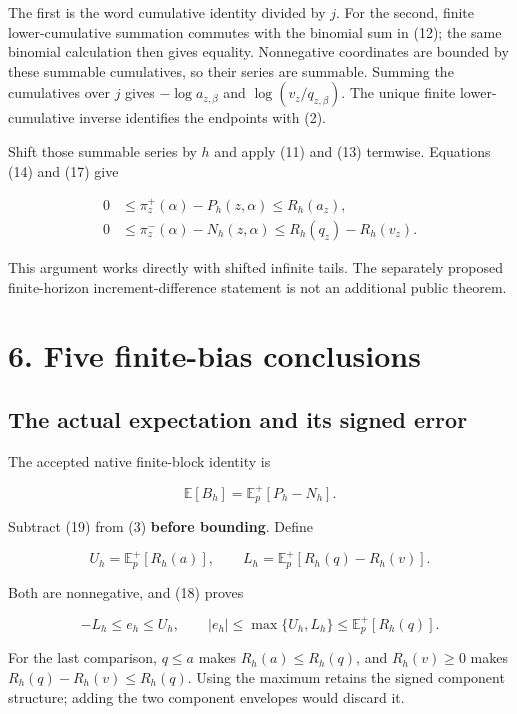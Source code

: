 \documentclass[11pt,a4paper]{article}
\begin{document}
The first is the word cumulative identity divided by \(j\). For the second, finite lower-cumulative summation commutes with the binomial sum in (12); the same binomial calculation then gives equality. Nonnegative coordinates are bounded by these summable cumulatives, so their series are summable. Summing the cumulatives over \(j\) gives \(-\log a_{z,\beta}\) and \(\log(v_z/q_{z,\beta})\). The unique finite lower-cumulative inverse identifies the endpoints with (2).

Shift those summable series by \(h\) and apply (11) and (13) termwise. Equations (14) and (17) give

\[
\begin{aligned}
0&\le\pi_z^+(\alpha)-P_h(z,\alpha)\le R_h(a_z),\\
0&\le\pi_z^-(\alpha)-N_h(z,\alpha)
       \le R_h(q_z)-R_h(v_z).
\end{aligned} \tag{18}
\]

This argument works directly with shifted infinite tails. The separately proposed finite-horizon increment-difference statement is not an additional public theorem.

\section{6. Five finite-bias conclusions}\label{five-finite-bias-conclusions}

\subsection{The actual expectation and its signed error}\label{the-actual-expectation-and-its-signed-error}

The accepted native finite-block identity is

\[
\mathbb E[B_h]=\mathbb E_p^+[P_h-N_h]. \tag{19}
\]

Subtract (19) from (3) \textbf{before bounding}. Define

\[
U_h=\mathbb E_p^+[R_h(a)],
\qquad
L_h=\mathbb E_p^+[R_h(q)-R_h(v)].
\]

Both are nonnegative, and (18) proves

\[
-L_h\le e_h\le U_h,
\qquad
|e_h|\le\max\{U_h,L_h\}\le\mathbb E_p^+[R_h(q)]. \tag{20}
\]

For the last comparison, \(q\le a\) makes \(R_h(a)\le R_h(q)\), and \(R_h(v)\ge0\) makes \(R_h(q)-R_h(v)\le R_h(q)\). Using the maximum retains the signed component structure; adding the two component envelopes would discard it.
\end{document}
